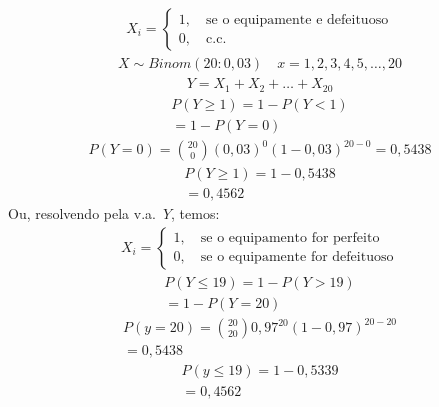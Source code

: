 \begin{description}
\begin{example}
\begin{enumerate}[label=(\alph*)]
            \begin{align*}
              X_i= \begin{cases}
                1, \quad \text{se o equipamente e defeituoso}\\
                0, \quad \text{c.c.\ }
              \end{cases} 
            \end{align*}
            \begin{align*}
              X           \sim Binom(20:0,03) \quad x=1,2,3,4,5,\dots,20
            \end{align*}
            \begin{align*}
              Y=X_1 + X_2 + \ldots +X_20 
            \end{align*}
            \begin{align*}
              P(Y\ge 1)= 1-P(Y<1)\\
              =1-P(Y=0)
            \end{align*}
            \begin{align*}
              P(Y=0)= \binom{20}{0} (0,03)^0 (1-0,03)^{20-0}
              =0,5438
            \end{align*}
            \begin{align*}
              P(Y\ge 1)= 1-0,5438\\
              =0,4562
            \end{align*}
            Ou, resolvendo pela v.a.\ $Y$, temos:
            \begin{align*}
              X_i= \begin{cases}
                1, \quad \text{se o equipamento for perfeito} \\
                0, \quad \text{se o equipamente for defeituoso}
              \end{cases} 
            \end{align*}
            \begin{align*}
              P(Y\le 19)=1-P(Y>19)\\
              =1-P(Y=20)
            \end{align*}
            \begin{align*}
              P(y=20)=\binom{20}{20}0,97^{20}(1-0,97)^{20-20}\\
              =0,5438
            \end{align*}
            \begin{align*}
              P(y\le 19)=1-0,5339\\
              =0,4562

\end{align*}
\end{enumerate}
\end{example}
\end{description}
